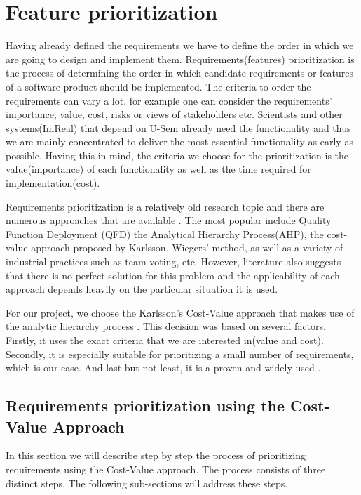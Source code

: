 \section{Feature prioritization}

Having already defined the requirements we have to define the order in which we are going to design and implement them. Requirements(features) prioritization is the process of determining the order in which candidate requirements or features of a software product should be implemented. The criteria to order the requirements can vary a lot, for example one can consider the requirements' importance, value, cost, risks or views of stakeholders etc. Scientists and other systems(ImReal) that depend on U-Sem already need the functionality and thus we are mainly concentrated to deliver the most essential functionality as early as possible. Having this in mind, the criteria we choose for the prioritization is the value(importance) of each functionality as well as the time required for implementation(cost).

Requirements prioritization is a relatively old research topic and there are numerous approaches that are available \cite{Moisiadis}. The most popular include Quality Function Deployment (QFD) the Analytical Hierarchy Process(AHP), the cost-value approach proposed by Karlsson, Wiegers' method, as well as a variety of industrial practices such as team voting, etc. However, literature also suggests that there is no perfect solution for this problem and the applicability of each approach depends heavily on the particular situation it is used.

For our project, we choose the Karlsson's Cost-Value approach that makes use of the analytic hierarchy process \cite{Karlsson}. This decision was based on several factors. Firstly, it uses the exact criteria that we are interested in(value and cost). Secondly, it is especially suitable for prioritizing a small number of requirements\cite{Karlsson}, which is our case. And last but not least, it is a proven and widely used \cite{Karlsson2}.


\subsection{Requirements prioritization using the Cost-Value Approach}

In this section we will describe step by step the process of prioritizing requirements using the Cost-Value approach. The process consists of three distinct steps. The following sub-sections will address these steps.

